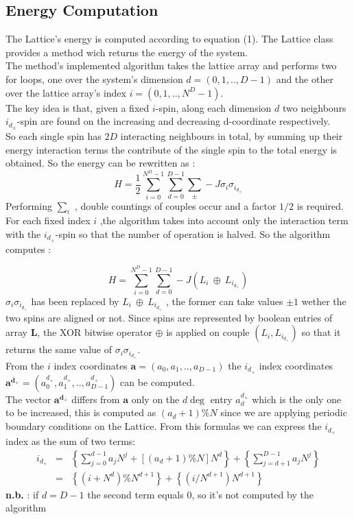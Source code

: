 \documentclass[11pt,a4paper]{article}
\begin{document}
\newpage
\subsection{Energy Computation}

The Lattice's energy is computed according to equation (1).
The Lattice class provides a method wich returns the energy of the system. \\
The method's implemented algorithm takes the lattice array and performs two for loops, one over the system's dimension $d = (0,1,..,D-1)$ and the other over the lattice array's index $i = (0,1,..,N^D-1)$. \\
The key idea is that, given a fixed $i$-spin, along each dimension $d$ two neighbours $i_{d_\pm}$-spin are found on the increasing and decreasing d-coordinate respectively.
\\So each single spin has $2D$ interacting neighbours in total, by summing up their energy interaction terms the contribute of the single spin to the total energy is obtained. So the energy can be rewritten as :
\begin{equation}
H = \frac{1}{2}\sum_{i=0}^{N^D-1}\sum_{d=0}^{D-1}\sum_{\pm}^{} -J\sigma_i\sigma_{i_{d_\pm}}
\end{equation}
Performing $\sum_{i}^{}$ , double countings of couples occur and a factor $1/2$ is required. \\
For each fixed index $i$ ,the algorithm takes into account only the interaction term with the
$i_{d_+}$-spin so that the number of operation is halved. So the algorithm computes :

\begin{equation}
H = \sum_{i=0}^{N^D-1}\sum_{d=0}^{D-1}-J(L_i \ \oplus \ L_{i_{d_+}})
\end{equation}
$\sigma_i\sigma_{i_{d_+}}$ has been replaced by $L_i \ \oplus \ L_{i_{d_+}}$ , the former can take values $\pm1$ wether the two spins are aligned or not. Since spins are represented by boolean entries of array $\mathbf{L}$, the XOR bitwise operator $\oplus$ is applied on couple $(L_i,L_{i_{d_+}})$ so that it returns the same value of $\sigma_i\sigma_{i_{d_+}}$. \\
\vspace{0.1cm}
From the $i$ index coordinates $\mathbf{a} = (a_0,a_1,..,a_{D-1})$ the $i_{d_+}$ index coordinates\\
$\mathbf{a^{d_+}} = (a^{d_+}_0,a^{d_+}_1,..,a^{d_+}_{D-1})$ can be computed. \\
The vector $\mathbf{a^{d_+}}$ differs from $\mathbf{a}$
only on the $d\deg$ entry $a^{d_+}_d$ which is the only one to be increased, this is computed as $(a_d+1)\%N$ since we are applying periodic boundary conditions on the Lattice.
From this formulas we can express the $i_{d_+}$ index as the sum of two terms:
\begin{eqnarray*}
  i_{d_+} &=& \left\{ \sum_{j = 0}^{d-1}a_jN^j + [(a_d + 1)\%N]N^d \right\} + \left\{ \sum_{j = d+1}^{D-1}a_jN^j \right\}  \\
          &=& \left\{(i + N^d)\%N^{d+1} \right\}  +  \left\{ (i/N^{d+1})N^{d+1}  \right\}
\end{eqnarray*}
\textbf{n.b.} : if $d = D-1$ the second term equals 0, so it's not computed by the algorithm
\newpage
\end{document}
